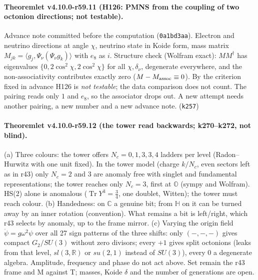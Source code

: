 \paragraph{Theoremlet v4.10.0-r59.11 (H126: PMNS from the coupling of two octonion directions; not testable).}
Advance note committed before the computation (\texttt{0a1bd3aa}).  Electron and neutrino directions at angle \(\chi\), neutrino state in Koide form,
mass matrix \(M_{jk}=\langle g_j,\Psi_\nu(\Psi_\nu g_k)\rangle\) with \(e_8\) as \(i\).  Structure check (Wolfram exact): \(MM^\dagger\) has eigenvalues
\(\{0,2\cos^2\chi,2\cos^2\chi\}\) for all \(\chi,\delta_\nu\), degenerate everywhere, and the non-associativity contributes exactly zero
(\(M-M_{\rm assoc}\equiv0\)).  By the criterion fixed in advance H126 is \emph{not testable}; the data comparison does not count.  The pairing reads only
\(1\) and \(e_8\), so the associator drops out.  A new attempt needs another pairing, a new number and a new advance note.  (\texttt{k257})

\paragraph{Theoremlet v4.10.0-r59.12 (the tower read backwards; k270--k272, not blind).}
(a) Three colours: the tower offers \(N_c=0,1,3,3,4\) ladders per level (Radon--Hurwitz with one unit fixed).  In the tower model (charge \(k/N_c\),
even sectors left as in r43) only \(N_c=2\) and \(3\) are anomaly free with singlet and fundamental representations; the tower reaches only
\(N_c=3\), first at \(\mathbb O\) (sympy and Wolfram).  HS(2) alone is anomalous (\(\operatorname{Tr}Y^3=\tfrac34\), one doublet, Witten); the tower must
reach colour.
(b) Handedness: on \(\mathbb C\) a genuine bit; from \(\mathbb H\) on it can be turned away by an inner rotation (convention).  What remains a bit is
left/right, which r43 selects by anomaly, up to the frame mirror.
(c) Varying the origin field \(\ddot\psi=g\omega^2\psi\) over all 27 sign patterns of the three shifts: only \((-,-,-)\) gives compact \(G_2/SU(3)\)
without zero divisors; every \(+1\) gives split octonions (leaks from that level, \(sl(3,\mathbb R)\) or \(su(2,1)\) instead of \(SU(3)\)), every \(0\) a
degenerate algebra.  Amplitude, frequency and phase do not act above.  Set remain the r43 frame and M against T; masses, Koide \(\delta\) and the
number of generations are open.

